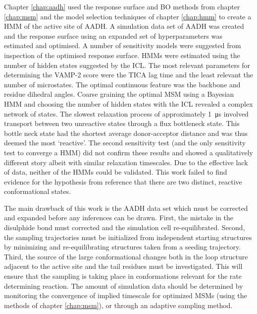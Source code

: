 Chapter \ref{chap:aadh} used the response surface and BO methods from chapter \ref{chap:msm} and the model selection techniques of chapter \ref{chap:hmm} to create a HMM of the active site of AADH. A simulation data set of AADH was created and the response surface using an expanded set of hyperparameters was estimated and optimised. A number of sensitivity models were suggested from inspection of the optimised response surface. HMMs were estimated using the number of hidden states suggested by the ICL. The most relevant parameters for determining the VAMP-2 score were the TICA lag time and the least relevant the number of microstates.  The optimal continuous feature was the backbone and residue dihedral angles. Coarse graining the optimal MSM using a Bayesian HMM and choosing the number of hidden states with the ICL revealed a complex network of states. The slowest relaxation process of approximately \SI{1}{\micro\second} involved transport between two unreactive states through a flux bottleneck state. This bottle neck state had the shortest average donor-acceptor distance and was thus deemed the most `reactive'. The second sensitivity test (and the only sensitivity test to converge a HMM) did not confirm these results and showed a qualitatively different story albeit with similar relaxation timescales. Due to the effective lack of data, neither of the HMMs could be validated. This work failed to find evidence for the hypothesis from reference \cite{glowackiTakingOckhamRazor2012b} that there are two distinct, reactive conformational states. 

The main drawback of this work is the AADH data set which must be corrected and expanded before any inferences can be drawn. First, the mistake in the disulphide bond must corrected and the simulation cell re-equilibrated. Second, the sampling trajectories must be initialized from independent starting structures by minimizing and re-equilibrating structures taken from a seeding trajectory. Third, the source of the large conformational changes both in the loop structure adjacent to the active site and the tail residues must be investigated. This will ensure that the sampling is taking place in  conformations relevant for the rate determining reaction. The amount of simulation data should be determined by monitoring the convergence of implied timescale  for optimized MSMs (using the methods of chapter \ref{chap:msm}), or through an adaptive sampling method\cite{doerrOntheFlyLearningSampling2014}. 

